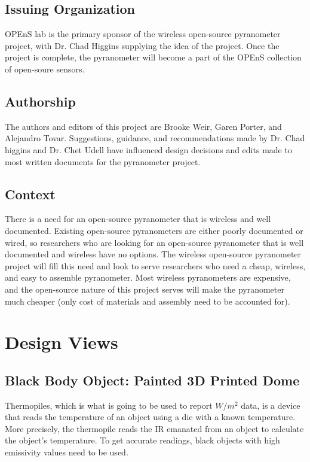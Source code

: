 \documentclass[10pt,draftclsnofoot,onecolumn,letterpaper]{article}
\begin{document}
\subsection{Issuing Organization}
OPEnS lab is the primary sponsor of the wireless open-source pyranometer project, with Dr. Chad Higgins supplying the idea of the project. Once the project is complete, the pyranometer will become a part of the OPEnS collection of open-soure sensors.

\subsection{Authorship}
The authors and editors of this project are Brooke Weir, Garen Porter, and Alejandro Tovar. Suggestions, guidance, and recommendations made by Dr. Chad higgins and Dr. Chet Udell have influenced design decisions and edits made to most written documents for the pyranometer project. 

\subsection{Context}
There is a need for an open-source pyranometer that is wireless and well documented. Existing open-source pyranometers are either poorly documented or wired, so researchers who are looking for an open-source pyranometer that is well documented and wireless have no options. The wireless open-source pyranometer project will fill this need and look to serve researchers who need a cheap, wireless, and easy to assemble pyranometer. Most wireless pyranometers are expensive, and the open-source nature of this project serves will make the pyranometer much cheaper (only cost of materials and assembly need to be accounted for).

\section{Design Views}
\subsection{Black Body Object: Painted 3D Printed Dome}
Thermopiles, which is what is going to be used to report $W/m^2$ data, is a device that reads the temperature of an object using a die with a known temperature. More precisely, the thermopile reads the IR emanated from an object to calculate the object's temperature. To get accurate readings, black objects with high emissivity values need to be used. 
\end{document}
